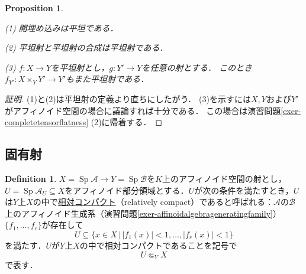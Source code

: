 \documentclass[a4paper,12pt, dvipdfmx]{jsbook}
\def\Sp{\mathop{\mathrm{Sp}}\nolimits}
\newcommand{\abs}[1]{\lvert#1\rvert}
\theoremstyle{plain}
\newtheorem{prop}[thm]{\bfseries Proposition}
\theoremstyle{definition}
\newtheorem{dfn}[thm]{\bfseries Definition}
\begin{document}
\begin{prop}\label{prop-flatmorphisms2}{\rm 
(1) 開埋め込みは平坦である．

(2) 平坦射と平坦射の合成は平坦射である．

(3) $f\colon X\rightarrow Y$を平坦射とし，$g\colon Y'\rightarrow Y$を任意の射とする．
このとき$f_{Y'}\colon X\times_YY'\rightarrow Y'$もまた平坦射である．}
\end{prop}

\begin{proof}[証明]
(1)と(2)は平坦射の定義より直ちにしたがう．
(3)を示すには$X,Y$および$Y'$がアフィノイド空間の場合に議論すれば十分である．
この場合は演習問題\ref{exer-completetensorflatness} (2)に帰着する．
\end{proof}

\subsection{固有射}\label{sub-propermorphisms}
\begin{dfn}\label{dfn-relativelycompact}{\rm 
$X=\Sp\mathcal{A}\rightarrow Y=\Sp\mathcal{B}$を$K$上のアフィノイド空間の射とし，$U=\Sp\mathcal{A}_U\subseteq X$をアフィノイド部分領域とする．$U$が次の条件を満たすとき，$U$は$Y$上$X$の中で\underline{相対コンパクト}（relatively compact）であると呼ばれる：$\mathcal{A}$の$\mathcal{B}$上のアフィノイド生成系（演習問題\ref{exer-affinoidalgebrageneratingfamily}）$\{f_1,\ldots,f_r\}$が存在して
$$
U\subseteq\{x\in X\,|\,\abs{f_1(x)}<1,\ldots,\abs{f_r(x)}<1\}
$$
を満たす．$U$が$Y$上$X$の中で相対コンパクトであることを記号で
$$
U\Subset_YX
$$
で表す．}
\end{dfn}
\end{document}
